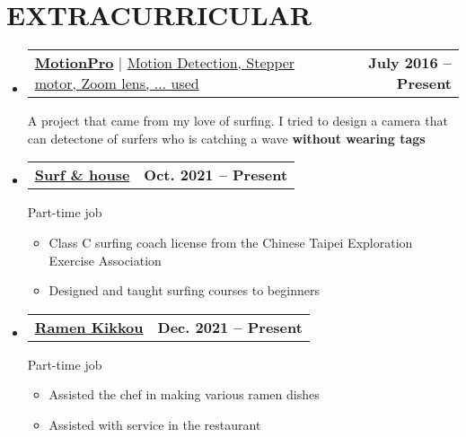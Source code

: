\documentclass[letterpaper,11pt]{article}
\makeatletter
\newcommand{\resumeItem}[1]{
  \item\small{
    {#1 \vspace{-0.5pt}}
  }
}
\newcommand{\resumeProjectHeading}[2]{
    \item
    \begin{tabular*}{1.001\textwidth}{l@{\extracolsep{\fill}}r}
      \small#1 & \textbf{\small #2}\\
    \end{tabular*}%
}
\newcommand{\resumeSubHeadingListStart}{\begin{itemize}[leftmargin=0.0in, label={}]}
\newcommand{\resumeSubHeadingListEnd}{\end{itemize}}
\newcommand{\resumeItemListStart}{\begin{itemize}}
\newcommand{\resumeItemListEnd}{\end{itemize}\vspace{-5pt}}
\newcommand\sbullet[1][.5]{\mathbin{\vcenter{\hbox{\scalebox{#1}{$\bullet$}}}}}
\makeatother
\begin{document}
\section{EXTRACURRICULAR}
    \resumeSubHeadingListStart
        \resumeProjectHeading
          {{\textbf{\large{\underline{MotionPro}}} \href{https://hackmd.io/motion-pro}{\raisebox{-0.1\height}\faExternalLink }} $|$ \large{\underline{Motion Detection, Stepper motor, Zoom lens, ... used}}}{July 2016 -- Present}
          A project that came from my love of surfing. I tried to design a camera that can detect\newline one of surfers who is catching a wave \textbf{without wearing tags}
        \vspace{-18pt}
        \resumeProjectHeading
          {{\textbf{\large{\underline{Surf \& house}}} \href{https://www.surfhouse.tw/}{\raisebox{-0.1\height}\faExternalLink }}}{Oct. 2021 -- Present}
          {Part-time job}
          \vspace{-5pt}
            \resumeItemListStart
                \resumeItem{Class C surfing coach license from the Chinese Taipei Exploration Exercise Association}
                \resumeItem{Designed and taught surfing courses to beginners}
            \resumeItemListEnd
        \vspace{-16pt}    
        \resumeProjectHeading
         {{\textbf{\large{\underline{Ramen Kikkou}}} \href{https://goo.gl/maps/6Gfw4KYR6en3mU5x7}{\raisebox{-0.1\height}\faExternalLink }}}{Dec. 2021 -- Present}
         {Part-time job}
         \vspace{-5pt}
            \resumeItemListStart
                \resumeItem{Assisted the chef in making various ramen dishes}
                \resumeItem{Assisted with service in the restaurant}
            \resumeItemListEnd    
    \resumeSubHeadingListEnd
 \vspace{-11pt}
 

\end{document}
